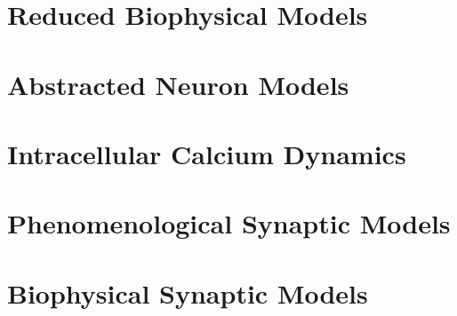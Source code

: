 \documentclass[12pt]{article}
\begin{document}
\section{Reduced Biophysical Models}
\graphicspath{ {./images/09/} }

\newpage

\section{Abstracted Neuron Models}
\graphicspath{ {./images/10/} }

\newpage

\section{Intracellular Calcium Dynamics}
\graphicspath{ {./images/11/} }

\newpage

\section{Phenomenological Synaptic Models}
\graphicspath{ {./images/12/} }

\newpage

\section{Biophysical Synaptic Models}
\graphicspath{ {./images/13/} }

\newpage
\end{document}
